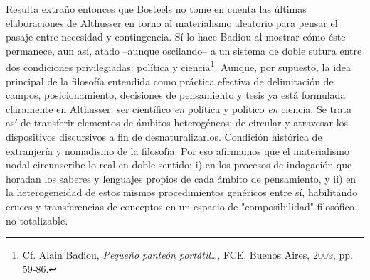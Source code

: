 \documentclass{book}
\begin{document}
Resulta extraño entonces que Bosteels no tome en cuenta las últimas
elaboraciones de Althusser en torno al materialismo aleatorio para
pensar el pasaje entre necesidad y contingencia. Sí lo hace Badiou al
mostrar cómo éste permanece, aun así, atado --aunque oscilando-- a un
sistema de doble sutura entre dos condiciones privilegiadas: política y
ciencia\footnote{Cf. Alain Badiou, \emph{Pequeño panteón
  portátil\ldots{}}, FCE, Buenos Aires, 2009, pp. 59-86.}. Aunque, por
supuesto, la idea principal de la filosofía entendida como práctica
efectiva de delimitación de campos, posicionamiento, decisiones de
pensamiento y tesis ya está formulada claramente en Althusser: ser
científico \emph{en} política y político \emph{en} ciencia. Se trata así
de transferir elementos de ámbitos heterogéneos; de circular y atravesar
los dispositivos discursivos a fin de desnaturalizarlos. Condición
histórica de extranjería y nomadismo de la filosofía. Por eso afirmamos
que el materialismo nodal circunscribe lo real en doble sentido: i) en
los procesos de indagación que horadan los saberes y lenguajes propios
de cada ámbito de pensamiento, y ii) en la heterogeneidad de estos
mismos procedimientos genéricos entre sí, habilitando cruces y
transferencias de conceptos en un espacio de "composibilidad" filosófico
no totalizable.
\end{document}
